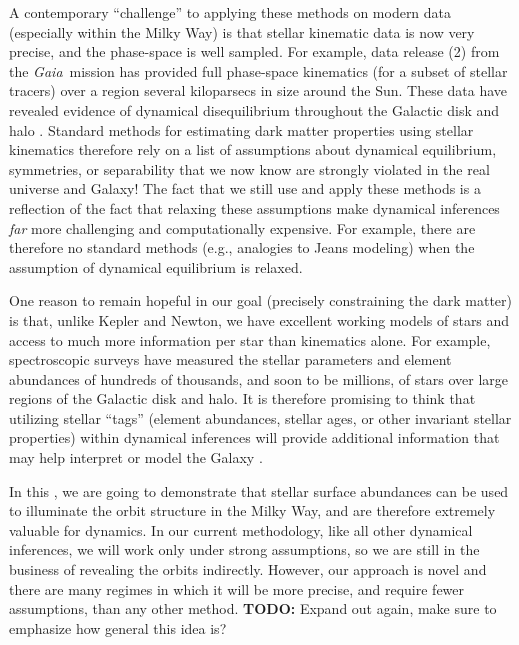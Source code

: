 \documentclass[modern]{aastex63}
\newcommand{\gaia}{\textsl{Gaia}}
\newcommand{\dr}[1]{\acronym{DR}#1}
\newcommand{\TODO}[1]{{\color{tabgreen}\textbf{TODO:} #1}}
\begin{document}
A contemporary ``challenge'' to applying these methods on modern data
(especially within the Milky Way) is that stellar kinematic data is now very
precise, and the phase-space is well sampled.
For example, data release (\dr{2}) from the \gaia\ mission
\citep{Gaia-Collaboration:2016, Gaia-Collaboration:2018} has provided full
phase-space kinematics (for a subset of stellar tracers) over a region several
kiloparsecs in size around the Sun.
These data have revealed evidence of dynamical disequilibrium throughout the
Galactic disk and halo \citep{Antoja:2018, Myeong:2018, Koppelman:2018,
Eilers:2020}.
Standard methods for estimating dark matter properties using stellar kinematics
therefore rely on a list of assumptions about dynamical equilibrium, symmetries,
or separability that we now know are strongly violated in the real universe and
Galaxy!
The fact that we still use and apply these methods is a reflection of the fact
that relaxing these assumptions make dynamical inferences \emph{far} more
challenging and computationally expensive.
For example, there are therefore no standard methods (e.g., analogies to Jeans
modeling) when the assumption of dynamical equilibrium is relaxed.

One reason to remain hopeful in our goal (precisely constraining the dark
matter) is that, unlike Kepler and Newton, we have excellent working models of
stars and access to much more information per star than kinematics alone.
For example, spectroscopic surveys have measured the stellar parameters and
element abundances of hundreds of thousands, and soon to be millions, of stars
\citep[e.g.,][]{DR16, Martell:2017, Deng:2012} over large regions of the
Galactic disk and halo.
It is therefore promising to think that utilizing stellar ``tags'' (element
abundances, stellar ages, or other invariant stellar properties) within
dynamical inferences will provide additional information that may help interpret
or model the Galaxy \citep[see, e.g.,][for recent methods that begin to move in
this direction, within the context of equilibrium models]{Sanders:2015,
Das:2016, Binney:2016, Iorio:2020}.

In this \documentname, we are going to demonstrate that stellar surface
abundances can be used to illuminate the orbit structure in the Milky Way, and
are therefore extremely valuable for dynamics.
In our current methodology, like all other dynamical inferences, we will work
only under strong assumptions, so we are still in the business of revealing the
orbits indirectly.
However, our approach is novel and there are many regimes in which it will be
more precise, and require fewer assumptions, than any other method.
\TODO{Expand out again, make sure to emphasize how general this idea is?}
\end{document}
